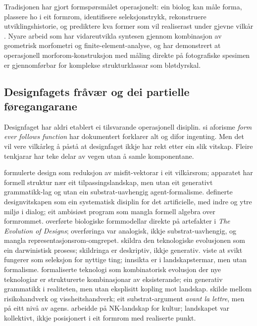 \documentclass[10pt,a4paper,twocolumn]{article}
\begin{document}
Tradisjonen har gjort formspørsmålet operasjonelt: ein biolog kan måle forma, plassere ho i eit formrom, identifisere seleksjonstrykk, rekonstruere utviklingshistorie, og prediktere kva former som vil realiserast under gjevne vilkår \citep{arnold2001, wagner2005}. Nyare arbeid som \citet{polly2016} har vidareutvikla syntesen gjennom kombinasjon av geometrisk morfometri og finite-element-analyse, og \citet{contrerasfigueroa2023} har demonstrert at operasjonell morforom-konstruksjon med måling direkte på fotografiske spesimen er gjennomførbar for komplekse strukturklassar som bløtdyrskal.

\subsection{Designfagets fråvær og dei partielle føregangarane}

Designfaget har aldri etablert ei tilsvarande operasjonell disiplin. \citet{sullivan1896} si aforisme \textit{form ever follows function} har \citet{michl1995} dokumentert forklarer alt og difor ingenting. Men det vil vere vilkårleg å påstå at designfaget ikkje har rekt etter ein slik vitskap. Fleire tenkjarar har teke delar av vegen utan å samle komponentane.

\citet{alexander1964} formulerte design som reduksjon av misfit-vektorar i eit vilkårsrom; apparatet har formell struktur nær eit tilpassingslandskap, men utan eit generativt grammatikk-lag og utan ein substrat-uavhengig agent-formalisme. \citet{simon1969} definerte designvitskapen som ein systematisk disiplin for det artificielle, med indre og ytre miljø i dialog; eit ambisiøst program som mangla formell algebra over formrommet. \citet{steadman1979} overførte biologiske formmodellar direkte på artefakter i \textit{The Evolution of Designs}; overføringa var ana\-logisk, ikkje substrat-uavhengig, og mangla representasjonsrom-omgrepet. \citet{basalla1988} skildra den teknologiske evolusjonen som ein darwinistisk prosess; skildringa er deskriptiv, ikkje generativ. \citet{petroski1992} viste at svikt fungerer som seleksjon for nyttige ting; innsikta er i landskapstermar, men utan formalisme. \citet{wbarthur2009} formaliserte teknologi som kombinatorisk evolusjon der nye teknologiar er strukturerte kombinasjonar av eksisterande; ein generativ grammatikk i realiteten, men utan eksplisitt kopling mot landskap. \citet{pye1968} skilde mellom risikohandverk og vissheitshandverk; eit substrat-argument \textit{avant la lettre}, men på eitt nivå av agens. \citet{kauffman1993} arbeidde på NK-landskap for kultur; landskapet var kollektivt, ikkje posisjonert i eit formrom med realiserte punkt.
\end{document}
